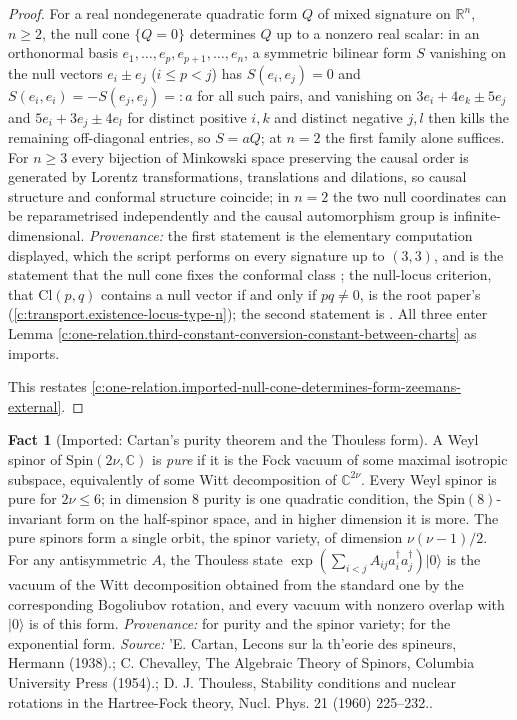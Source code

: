 \documentclass[11pt]{article}
\theoremstyle{definition}
\newtheorem{fact}[theorem]{Fact}
\theoremstyle{plain}
\providecommand{\C}{}\renewcommand{\C}{\mathbb{C}}
\providecommand{\Cl}{}\renewcommand{\Cl}{\mathrm{Cl}}
\providecommand{\R}{}\renewcommand{\R}{\mathbb{R}}
\begin{document}
\begin{proof}
For a real nondegenerate quadratic form $Q$ of mixed signature on $\R^{n}$, $n \geq 2$, the null cone $\{Q = 0\}$ determines $Q$ up to a nonzero real scalar: in an orthonormal basis $e_{1}, \dots, e_{p}, e_{p+1}, \dots, e_{n}$, a symmetric bilinear form $S$ vanishing on the null vectors $e_{i} \pm e_{j}$ ($i \leq p < j$) has $S(e_{i}, e_{j}) = 0$ and $S(e_{i}, e_{i}) = -S(e_{j}, e_{j}) =: a$ for all such pairs, and vanishing on $3e_{i} + 4e_{k} \pm 5e_{j}$ and $5e_{i} + 3e_{j} \pm 4e_{l}$ for distinct positive $i, k$ and distinct negative $j, l$ then kills the remaining off-diagonal entries, so $S = aQ$; at $n = 2$ the first family alone suffices. For $n \geq 3$ every bijection of Minkowski space preserving the causal order is generated by Lorentz transformations, translations and dilations, so causal structure and conformal structure coincide; in $n = 2$ the two null coordinates can be reparametrised independently and the causal automorphism group is infinite-dimensional. \emph{Provenance:} the first statement is the elementary computation displayed, which the script performs on every signature up to $(3,3)$, and is the statement that the null cone fixes the conformal class \cite{HawkingEllis1973}; the null-locus criterion, that $\Cl(p,q)$ contains a null vector if and only if $pq \neq 0$, is the root paper's \cite[Prop.~3.3]{ButlerT1} (\ref{c:transport.existence-locus-type-n}); the second statement is \cite{Zeeman1964}. All three enter Lemma \ref{c:one-relation.third-constant-conversion-constant-between-charts} as imports.

This restates \ref{c:one-relation.imported-null-cone-determines-form-zeemans-external}.

\end{proof}

\begin{fact}[Imported: Cartan's purity theorem and the Thouless form]\label{c:one-relation.imported-cartans-purity-theorem-thouless-form}
A Weyl spinor of $\mathrm{Spin}(2\nu, \C)$ is \emph{pure} if it is the Fock vacuum of some maximal isotropic subspace, equivalently of some Witt decomposition of $\C^{2\nu}$. Every Weyl spinor is pure for $2\nu \leq 6$; in dimension $8$ purity is one quadratic condition, the $\mathrm{Spin}(8)$-invariant form on the half-spinor space, and in higher dimension it is more. The pure spinors form a single orbit, the spinor variety, of dimension $\nu(\nu - 1)/2$. For any antisymmetric $A$, the Thouless state $\exp(\sum_{i<j}A_{ij}a^{\dagger}_{i}a^{\dagger}_{j})|0\rangle$ is the vacuum of the Witt decomposition obtained from the standard one by the corresponding Bogoliubov rotation, and every vacuum with nonzero overlap with $|0\rangle$ is of this form. \emph{Provenance:} \cite{Cartan1938, Chevalley1954} for purity and the spinor variety; \cite{Thouless1960} for the exponential form.
\emph{Source:} 'E. Cartan, Lecons sur la th'eorie des spineurs, Hermann (1938).; C. Chevalley, The Algebraic Theory of Spinors, Columbia University Press (1954).; D. J. Thouless, Stability conditions and nuclear rotations in the Hartree-Fock theory, Nucl. Phys. 21 (1960) 225--232..
\end{fact}
\end{document}
